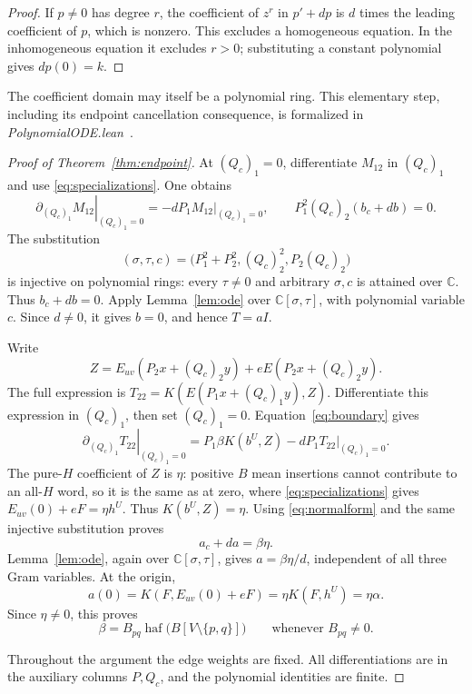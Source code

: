 \documentclass[11pt]{article}
\theoremstyle{definition}
\theoremstyle{plain}
\numberwithin{equation}{section}
\begin{document}
\begin{proof}
If \(p\ne0\) has degree \(r\), the coefficient of \(z^r\) in \(p'+dp\)
is \(d\) times the leading coefficient of \(p\), which is nonzero.
This excludes a homogeneous equation. In the inhomogeneous equation it
excludes \(r>0\); substituting a constant polynomial gives \(dp(0)=k\).
\end{proof}

The coefficient domain may itself be a polynomial ring. This elementary
step, including its endpoint cancellation consequence, is formalized in
\emph{PolynomialODE.lean}~\cite{lean}.

\begin{proof}[Proof of Theorem~\ref{thm:endpoint}]
At \((Q_c)_1=0\), differentiate \(M_{12}\) in \((Q_c)_1\) and use
\eqref{eq:specializations}. One obtains
\[
 \left.\partial_{(Q_c)_1}M_{12}\right|_{(Q_c)_1=0}
       =-dP_1\left.M_{12}\right|_{(Q_c)_1=0},
 \qquad P_1^2(Q_c)_2(b_c+db)=0.
\]
The substitution
\[
 (\sigma,\tau,c)=\bigl(P_1^2+P_2^2,(Q_c)_2^2,P_2(Q_c)_2\bigr)
\]
is injective on polynomial rings: every \(\tau\ne0\) and arbitrary
\(\sigma,c\) is attained over \(\mathbb C\). Thus \(b_c+db=0\).
Apply Lemma~\ref{lem:ode} over \(\mathbb C[\sigma,\tau]\), with polynomial
variable \(c\). Since \(d\ne0\), it gives \(b=0\), and hence \(T=aI\).

Write
\[
 Z=E_{uv}(P_2x+(Q_c)_2y)+eE(P_2x+(Q_c)_2y).
\]
The full expression is \(T_{22}=K(E(P_1x+(Q_c)_1y),Z)\). Differentiate
this expression in \((Q_c)_1\), then set \((Q_c)_1=0\).
Equation~\eqref{eq:boundary} gives
\[
 \left.\partial_{(Q_c)_1}T_{22}\right|_{(Q_c)_1=0}
 =P_1\beta K(b^U,Z)-dP_1\left.T_{22}\right|_{(Q_c)_1=0}.
\]
The pure-\(H\) coefficient of \(Z\) is \(\eta\): positive \(B\) mean
insertions cannot contribute to an all-\(H\) word, so it is the same as
at zero, where \eqref{eq:specializations} gives
\(E_{uv}(0)+eF=\eta h^U\). Thus \(K(b^U,Z)=\eta\). Using
\eqref{eq:normalform} and the same injective substitution proves
\[
 a_c+da=\beta\eta.
\]
Lemma~\ref{lem:ode}, again over \(\mathbb C[\sigma,\tau]\), gives
\(a=\beta\eta/d\), independent of all three Gram variables. At the origin,
\[
 a(0)=K(F,E_{uv}(0)+eF)=\eta K(F,h^U)=\eta\alpha.
\]
Since \(\eta\ne0\), this proves
\begin{equation}
 \beta=B_{pq}\operatorname{haf}\bigl(B[V\setminus\{p,q\}]\bigr)
 \qquad\text{whenever }B_{pq}\ne0.
 \tag{10}\label{eq:endpoint}
\end{equation}

Throughout the argument the edge weights are fixed. All differentiations are
in the auxiliary columns \(P,Q_c\), and the polynomial identities are finite.
\end{proof}
\end{document}
